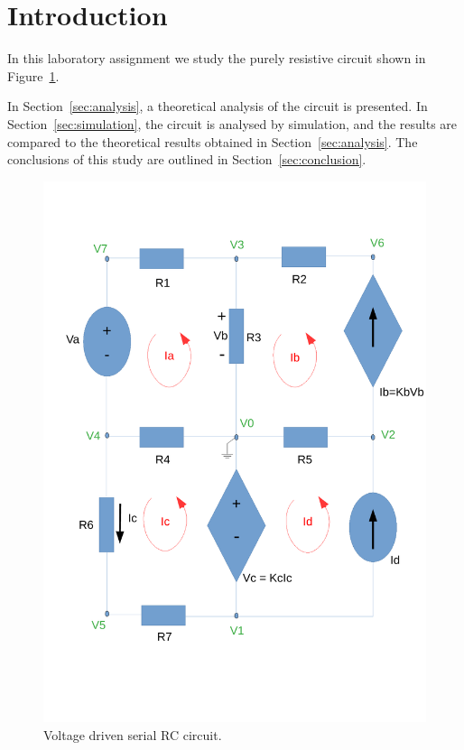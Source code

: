 \section{Introduction}
\label{sec:introduction}

In this laboratory assignment we study the purely resistive circuit shown in Figure~\ref{fig:rc}.



In Section~\ref{sec:analysis}, a theoretical analysis of the circuit is
presented. In Section~\ref{sec:simulation}, the circuit is analysed by
simulation, and the results are compared to the theoretical results obtained in
Section~\ref{sec:analysis}. The conclusions of this study are outlined in
Section~\ref{sec:conclusion}.

\begin{figure}[ht] \centering
    \includegraphics[width=0.4\linewidth]{circuito_tcfe.pdf}
    \caption{Voltage driven serial RC circuit.}
    \label{fig:rc}
\end{figure}

